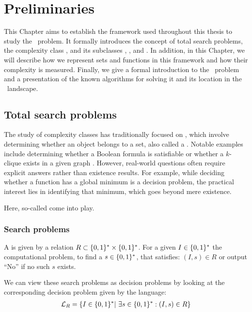 \setchapterpreamble[u]{\margintoc}
\chapter{Preliminaries}

This Chapter aims to establish the framework used throughout this thesis to study the \Tarski\ problem. It formally introduces the concept of total search problems, the complexity class \TFNP, and its subclasses \PLS, \PPAD, and \EOPL. In addition, in this Chapter, we will describe how we represent sets and functions in this framework and how their complexity is measured. Finally, we give a formal introduction to the \Tarski\ problem and a presentation of the known algorithms for solving it and its location in the \TFNP\ landscape.

\section{Total search problems}

The study of complexity classes has traditionally focused on , which involve determining whether an object belongs to a set, also called a . Notable examples include determining whether a Boolean formula is satisfiable or whether a $k$-clique exists in a given graph . However, real-world questions often require explicit answers rather than existence results. For example, while deciding whether a function has a global minimum is a decision problem, the practical interest lies in identifying that minimum, which goes beyond mere existence.

Here, so-called  come into play.

\subsection{Search problems}

\begin{definition}
    A  is given by a relation $R\subset \{0, 1\}^* \times \{0, 1\}^*$. For a given  $I\in \{0, 1\}^*$ the computational problem, to find a  $s \in \{0, 1\}^*$, that satisfies: $(I, s) \in R$ or output ``No'' if no such $s$ exists.
\end{definition}

We can view these search problems as decision problems by looking at the corresponding decision problem given by the language:
\begin{align*}
    \mathcal{L}_R = \{ I \in \{0, 1\}^* |\ \exists s \in \{0, 1\}^* : (I, s) \in R\}
\end{align*}

